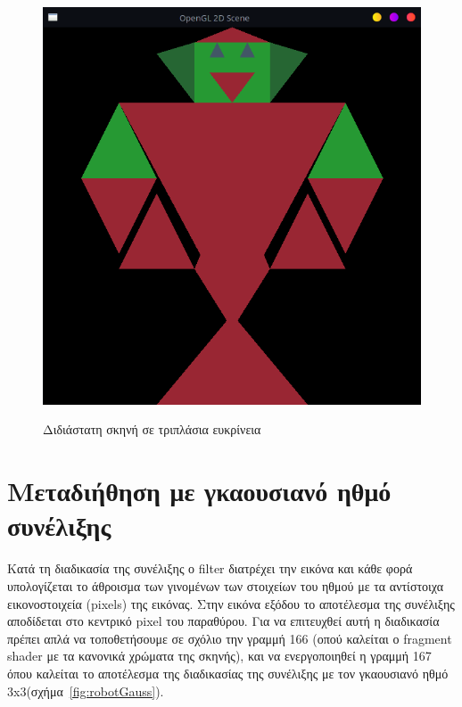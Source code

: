 \documentclass[12pt]{article}
\begin{document}
\begin{figure}[!h]
\centering
    {\includegraphics[width=1\textwidth]
    {robot_triple_size.png}}
    \caption{\label{fig:robotTriple} Διδιάστατη σκηνή σε τριπλάσια ευκρίνεια}
\end{figure}
\clearpage



\section{Μεταδιήθηση με γκαουσιανό ηθμό συνέλιξης}
Κατά τη διαδικασία της συνέλιξης ο \gls{filter} διατρέχει την εικόνα και κάθε φορά υπολογίζεται το άθροισμα των γινομένων των στοιχείων του ηθμού με τα αντίστοιχα εικονοστοιχεία (pixels) της εικόνας. Στην εικόνα εξόδου το αποτέλεσμα της συνέλιξης αποδίδεται στο κεντρικό pixel του παραθύρου. Για να επιτευχθεί αυτή η διαδικασία πρέπει απλά να τοποθετήσουμε σε σχόλιο την γραμμή 166 (οπού καλείται ο fragment shader με τα κανονικά χρώματα της σκηνής), και να ενεργοποιηθεί η γραμμή 167 όπου καλείται το αποτέλεσμα της διαδικασίας της συνέλιξης με τον γκαουσιανό ηθμό 3x3(σχήμα~\ref{fig:robotGauss}).
\end{document}
